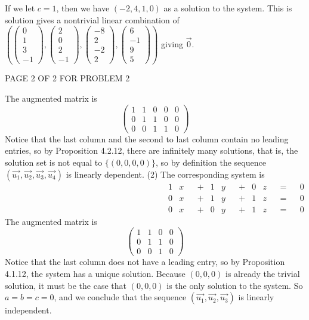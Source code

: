 \documentclass[12pt]{article}
\newenvironment{problem}[2][Problem]
{
	\begin{trivlist} 
		\item[\hskip \labelsep {\bfseries #1 #2:}]
	}
{
	\end{trivlist}
	}
\begin{document}
\begin{problem}{6}
If we let $c=1$, then we have $(-2,4,1,0)$ as a solution to the system. This is solution gives a nontrivial linear combination of $\left(\begin{pmatrix}0\\1\\3\\-1\end{pmatrix}, \begin{pmatrix}2\\0\\2\\-1\end{pmatrix}, \begin{pmatrix}-8\\2\\-2\\2\end{pmatrix}, \begin{pmatrix}6\\-1\\9\\5\end{pmatrix}\right)$ giving $\vec{0}$.
\vfill
\centerline{PAGE 2 OF 2 FOR PROBLEM 2}
%
%
%
\newpage
The augmented matrix is
\[
\begin{pmatrix}1&1&0&0&0\\0&1&1&0&0\\0&0&1&1&0\end{pmatrix}
\]
Notice that the last column and the second to last column contain no leading entries, so by Proposition 4.2.12, there are infinitely many solutions, that is, the solution set is not equal to $\{(0,0,0,0)\}$, so by definition the  sequence $(\vec{u_1},\vec{u_2},\vec{u_3},\vec{u_4})$ is linearly dependent.
\newline
\newline
\noindent
(2)
The corresponding system is
\begin{align*}
&&&&&&&& &&&&&&&& &&&&&&&& 1&x& &+& 1&y& &+& 0&z& &=& &0& &&&&&&&& &&&&&&&& &&&&&&&&\\
&&&&&&&& &&&&&&&& &&&&&&&& 0&x& &+& 1&y& &+& 1&z& &=& &0& &&&&&&&& &&&&&&&& &&&&&&&&\\
&&&&&&&& &&&&&&&& &&&&&&&& 0&x& &+& 0&y& &+& 1&z& &=& &0& &&&&&&&& &&&&&&&& &&&&&&&&
\end{align*}
The augmented matrix is
\[
\begin{pmatrix}1&1&0&0\\0&1&1&0\\0&0&1&0\end{pmatrix}
\]
Notice that the last column does not have a leading entry, so by Proposition 4.1.12, the system has a unique solution. Because $(0,0,0)$ is already the trivial solution, it must be the case that $(0,0,0)$ is the only solution to the system. So $a=b=c=0$, and we conclude that the sequence $(\vec{u_1},\vec{u_2},\vec{u_3})$ is linearly independent.

\end{problem}
\end{document}
